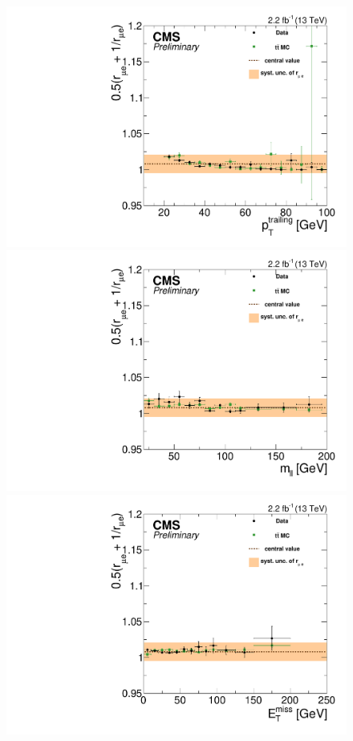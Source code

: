 \begin{figure}[htbp]
\begin{minipage}[t]{0.3\textwidth}
    \includegraphics[width=\textwidth]{bkgd/figs/rSFOFFromRMuE_ZPeakControlCentral_Run2015_25ns_TrailingPt_None.pdf}
  \end{minipage}
  \begin{minipage}[t]{0.3\textwidth}
    \includegraphics[width=\textwidth]{bkgd/figs/rSFOFFromRMuE_ZPeakControlCentral_Run2015_25ns_Mll_None.pdf}
  \end{minipage}
  \begin{minipage}[t]{0.3\textwidth}
    \includegraphics[width=\textwidth]{bkgd/figs/rSFOFFromRMuE_ZPeakControlCentral_Run2015_25ns_MET_None.pdf}

\end{minipage}
\end{figure}

